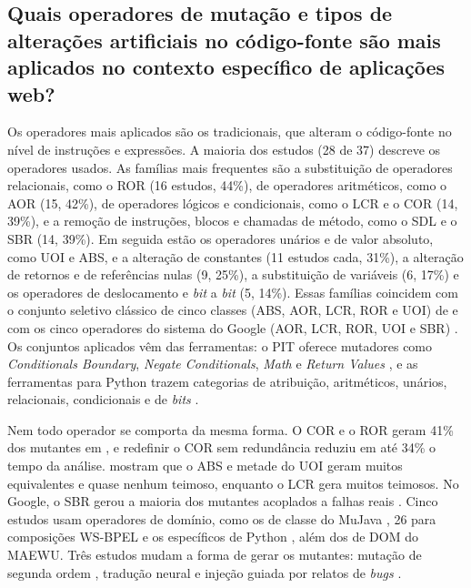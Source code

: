 \subsection[Quais operadores são mais utilizadas na literatura?]{Quais operadores de mutação e tipos de alterações artificiais no código-fonte são mais aplicados no contexto específico de aplicações web?}
\label{subsec:operadores-utilizadas}

Os operadores mais aplicados são os tradicionais, que alteram o código-fonte no nível de instruções e expressões. A maioria dos estudos (28 de 37) descreve os operadores usados. As famílias mais frequentes são a substituição de operadores relacionais, como o ROR (16 estudos, 44\%), de operadores aritméticos, como o AOR (15, 42\%), de operadores lógicos e condicionais, como o LCR e o COR (14, 39\%), e a remoção de instruções, blocos e chamadas de método, como o SDL e o SBR (14, 39\%). Em seguida estão os operadores unários e de valor absoluto, como UOI e ABS, e a alteração de constantes (11 estudos cada, 31\%), a alteração de retornos e de referências nulas (9, 25\%), a substituição de variáveis (6, 17\%) e os operadores de deslocamento e \textit{bit} a \textit{bit} (5, 14\%). Essas famílias coincidem com o conjunto seletivo clássico de cinco classes (ABS, AOR, LCR, ROR e UOI) de  e com os cinco operadores do sistema do Google (AOR, LCR, ROR, UOI e SBR) \cite{petrovic2021}. Os conjuntos aplicados vêm das ferramentas: o PIT oferece mutadores como \textit{Conditionals Boundary}, \textit{Negate Conditionals}, \textit{Math} e \textit{Return Values} \cite{assylbekov2013, zhang2022}, e as ferramentas para Python trazem categorias de atribuição, aritméticos, unários, relacionais, condicionais e de \textit{bits} \cite{guerino2024}.

Nem todo operador se comporta da mesma forma. O COR e o ROR geram 41\% dos mutantes em , e redefinir o COR sem redundância reduziu em até 34\% o tempo da análise.  mostram que o ABS e metade do UOI geram muitos equivalentes e quase nenhum teimoso, enquanto o LCR gera muitos teimosos. No Google, o SBR gerou a maioria dos mutantes acoplados a falhas reais \cite{petrovic2021}. Cinco estudos usam operadores de domínio, como os de classe do MuJava \cite{chauhan2015, nica2011}, 26 para composições WS-BPEL \cite{esterobotaro2010} e os específicos de Python \cite{guerino2024}, além dos de DOM do MAEWU. Três estudos mudam a forma de gerar os mutantes: mutação de segunda ordem \cite{kintis2010}, tradução neural \cite{tufano2020} e injeção guiada por relatos de \textit{bugs} \cite{khanfir2023}.

